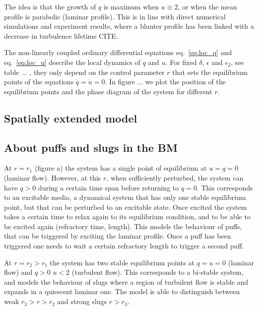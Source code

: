 \documentclass{article}
\begin{document}
The idea is that the growth of $q$ is maximum when $u \equiv  2$, or when the mean profile is parabolic (laminar profile). This is in line with direct numerical simulations and experiment results, where a blunter profile has been linked with a decrease in turbulence lifetime CITE.

The non-linearly coupled ordinary differential equations eq.~\ref{eq:loc_q} and eq.~\ref{eq:loc_u} describe the local dynamics of $q$ and $u$. For fixed $\delta$, $\epsilon$ and $\epsilon_{2}$, see table ... , they only depend on the control parameter $r$ that sets the equilibrium points of the equations $\dot{q}=\dot{u}=0$. In figure ... we plot the position of the equilibrium points and the phase diagram of the system for different $r$. 



\subsection{Spatially extended model}






\subsection{About puffs and slugs in the BM}



At $r=r_{1}$ (figure a) the system has a single point of equilibrium at $u=q=0$ (laminar flow). However, at this $r$, when sufficiently perturbed, the system can have $q>0$ during a certain time span before returning to $q=0$. This corresponds to an excitable media, a dynamical system that has only one stable equilibrium point, but that can be perturbed to an excitable state. Once excited the system takes a certain time to relax again to its equilibrium condition, and to be able to be excited again (refractory time, length). This models the behaviour of puffs, that can be triggered by exciting the laminar profile. Once a puff has been triggered one needs to wait a certain refractory length to trigger a second puff. 

At $r=r_{2}>r_{1}$ the system has two stable equilibrium points at $q=u=0$ (laminar flow) and $q>0$ $u<2$ (turbulent flow). This corresponds to a bi-stable system, and models the behaviour of slugs where a region of turbulent flow is stable and expands in a quiescent laminar one. The model is able to distinguish between weak $r_{3}>r>r_{2}$ and strong slugs $r>r_{3}$.
\end{document}
